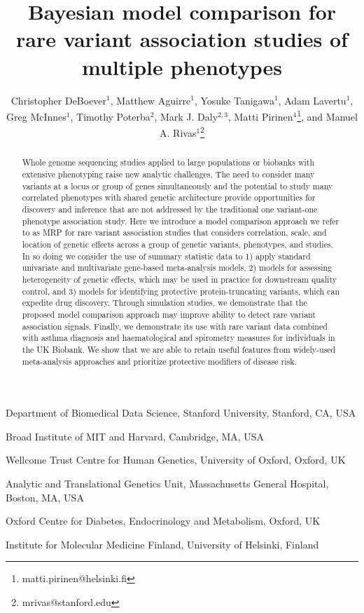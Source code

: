 \documentclass{nature}
\title{Bayesian model comparison for rare variant association studies of multiple phenotypes}
\author{Christopher DeBoever$^{1}$, Matthew Aguirre$^{1}$, Yosuke Tanigawa$^{1}$, Adam Lavertu$^{1}$, Greg McInnes$^{1}$, Timothy Poterba$^{2}$, Mark J. Daly$^{2,3}$,  Matti Pirinen$^{4}$\thanks{matti.pirinen@helsinki.fi}, and Manuel A. Rivas$^{1}$\thanks{mrivas@stanford.edu}}
\begin{document}
\maketitle
\begin{abstract}
\singlespacing
Whole genome sequencing studies applied to large populations or biobanks with extensive phenotyping raise new analytic challenges. The need to consider many variants at a locus or group of genes simultaneously and the potential to study many correlated phenotypes with shared genetic architecture provide opportunities for discovery and inference that are not addressed by the traditional one variant-one phenotype association study. Here we introduce a model comparison approach we refer to as MRP for rare variant association studies that considers correlation, scale, and location of genetic effects across a group of genetic variants, phenotypes, and studies. In so doing we consider the use of summary statistic data to 1) apply standard univariate and multivariate gene-based meta-analysis models, 2) models for assessing heterogeneity of genetic effects, which may be used in practice for downstream quality control, and 3) models for identifying protective protein-truncating variants, which can expedite drug discovery.  Through simulation studies, we demonstrate that the proposed model comparison approach may improve ability to detect rare variant association signals. Finally, we demonstrate its use with rare variant data combined with asthma diagnosis and haematological and spirometry measures for individuals in the UK Biobank. We show that we are able to retain useful features from widely-used meta-analysis approaches and prioritize protective modifiers of disease risk.
\end{abstract}

\begin{affiliations}
\item Department of Biomedical Data Science, Stanford University, Stanford, CA, USA
\item Broad Institute of MIT and Harvard, Cambridge, MA, USA
\item Wellcome Trust Centre for Human Genetics, University of Oxford, Oxford, UK
\item Analytic and Translational Genetics Unit, Massachusetts General Hospital, Boston, MA, USA
\item Oxford Centre for Diabetes, Endocrinology and Metabolism, Oxford, UK
\item Institute for Molecular Medicine Finland, University of Helsinki, Finland
\end{affiliations}
\newpage
\end{document}
